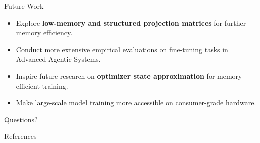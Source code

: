 \documentclass{beamer}
\begin{document}
\begin{frame}{Future Work}
    \begin{itemize}
        \item Explore \textbf{low-memory and structured projection matrices} for further memory efficiency.
        \item Conduct more extensive empirical evaluations on fine-tuning tasks in Advanced Agentic Systems.
        \item Inspire future research on \textbf{optimizer state approximation} for memory-efficient training.
        \item Make large-scale model training more accessible on consumer-grade hardware.
    \end{itemize}
\end{frame}

\begin{frame}{}
    \begin{center}
        Questions?
    \end{center}
\end{frame}

\begin{frame}[allowframebreaks]{References}
    \small
    
    
\end{frame}
\end{document}

